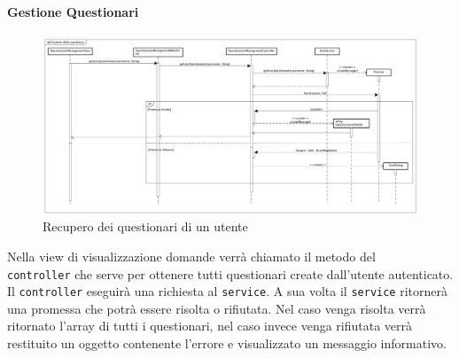 \paragraph{Gestione Questionari}

\label{Recupero dei questionari di un utente}

\begin{figure}[ht]
	\centering
	\includegraphics[scale=0.25,keepaspectratio]{UML/DiagrammiDiSequenza/Front-end/QuestionnaireManagement.png}
	\caption{Recupero dei questionari di un utente}
\end{figure} \FloatBarrier

Nella view di visualizzazione domande verrà chiamato il metodo del\\ \texttt{controller} che serve per ottenere tutti questionari create dall'utente autenticato. Il \texttt{controller} eseguirà una richiesta al \texttt{service}. A sua volta il \texttt{service} ritornerà una promessa che potrà essere risolta o rifiutata. Nel caso venga risolta verrà ritornato l'array di tutti i questionari, nel caso invece venga rifiutata verrà restituito un oggetto contenente l'errore e visualizzato un messaggio informativo. 